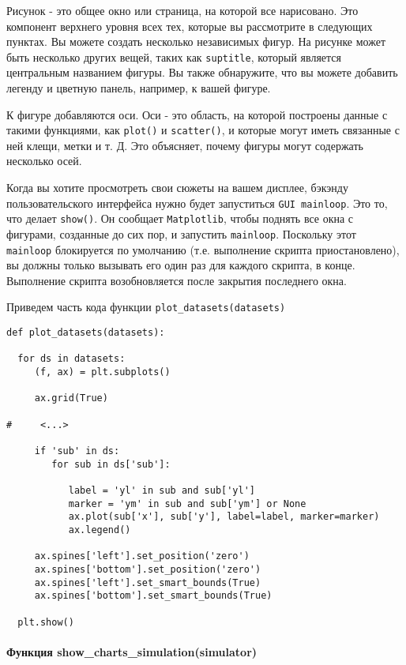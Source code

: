 Рисунок - это общее окно или страница, на которой все нарисовано. Это компонент верхнего уровня всех тех, которые вы рассмотрите в следующих пунктах. Вы можете создать несколько независимых фигур. На рисунке может быть несколько других вещей, таких как \lstinline!suptitle!, который является центральным названием фигуры. Вы также обнаружите, что вы можете добавить легенду и цветную панель, например, к вашей фигуре.

К фигуре добавляются оси. Оси - это область, на которой построены данные с такими функциями, как \lstinline!plot()! и \lstinline!scatter()!, и которые могут иметь связанные с ней клещи, метки и т. Д. Это объясняет, почему фигуры могут содержать несколько осей.

Когда вы хотите просмотреть свои сюжеты на вашем дисплее, бэкэнду пользовательского интерфейса нужно будет запуститься \lstinline!GUI mainloop!. Это то, что делает \lstinline!show()!. Он сообщает \lstinline!Matplotlib!, чтобы поднять все окна с фигурами, созданные до сих пор, и запустить \lstinline!mainloop!. Поскольку этот \lstinline!mainloop! блокируется по умолчанию (т.е. выполнение скрипта приостановлено), вы должны только вызывать его один раз для каждого скрипта, в конце. Выполнение скрипта возобновляется после закрытия последнего окна.

Приведем часть кода функции \lstinline!plot_datasets(datasets)!

\begin{lstlisting}[style=pythonstyle,caption={  }, label=lst:func:1]
def plot_datasets(datasets):

  for ds in datasets:
     (f, ax) = plt.subplots()

     ax.grid(True)

#     <...>

     if 'sub' in ds:
        for sub in ds['sub']:

           label = 'yl' in sub and sub['yl']
           marker = 'ym' in sub and sub['ym'] or None
           ax.plot(sub['x'], sub['y'], label=label, marker=marker)
           ax.legend()

     ax.spines['left'].set_position('zero')
     ax.spines['bottom'].set_position('zero')
     ax.spines['left'].set_smart_bounds(True)
     ax.spines['bottom'].set_smart_bounds(True)

  plt.show()
\end{lstlisting}

\paragraph{Функция show\_charts\_simulation(simulator)}

